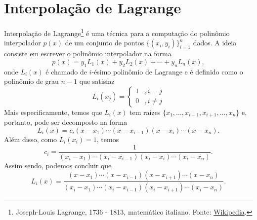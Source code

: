 \emconstrucao

\section{Interpolação de Lagrange}\label{cap_interp_sec_lagrange}

Interpolação de Lagrange\footnote{Joseph-Louis Lagrange, 1736 - 1813, matemático italiano. Fonte: \href{https://en.wikipedia.org/wiki/Joseph-Louis_Lagrange}{Wikipedia}.} é uma técnica para a computação do polinômio interpolador $p(x)$ de um conjunto de pontos $\{(x_i, y_i)\}_{i=1}^n$ dados. A ideia consiste em escrever o polinômio interpolador na forma
\begin{equation}
  p(x) = y_1L_1(x) + y_2L_2(x) + \cdots + y_nL_n(x),
\end{equation}
onde $L_i(x)$ é chamado de $i$-ésimo polinômio de Lagrange e é definido como o polinômio de grau $n-1$ que satisfaz
\begin{equation}
  L_i(x_j) = \left\{
    \begin{array}{ll}
      1 &, i=j\\
      0 &, i\neq j
    \end{array}
\right.
\end{equation}
Mais especificamente, temos que $L_i(x)$ tem raízes $\{x_1, \ldots, x_{i-1}, x_{i+1}, \ldots, x_n\}$ e, portanto, pode ser decomposto na forma
\begin{equation}
  L_i(x) = c_i(x-x_1)\cdots(x-x_{i-1})(x-x_i)\cdots(x-x_n).
\end{equation}
Além disso, como $L_i(x_i) = 1$, temos
\begin{equation}
  c_i = \frac{1}{(x_i-x_1)\cdots(x_i-x_{i-1})(x_i-x_i)\cdots(x_i-x_n)}.
\end{equation}
Assim sendo, podemos concluir que
\begin{equation}
  L_i(x) = \frac{(x-x_1)\cdots(x-x_{i-1})(x-x_{i+1})\cdots(x-x_n)}{(x_i-x_1)\cdots(x_i-x_{i-1})(x_i-x_{i+1})\cdots(x_i-x_n)}.
\end{equation}


